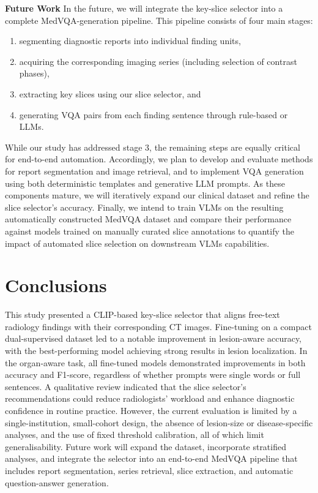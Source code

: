 \documentclass[bioengineering,article,submit,pdftex,moreauthors]{Definitions/mdpi}
\begin{document}
\textbf{Future Work}
In the future, we will integrate the key-slice selector into a complete MedVQA-generation pipeline. 
This pipeline consists of four main stages: 
\begin{enumerate}
  \item segmenting diagnostic reports into individual finding units, 
  \item acquiring the corresponding imaging series (including selection of contrast phases),
  \item extracting key slices using our slice selector, and 
  \item generating VQA pairs from each finding sentence through rule-based or LLMs.
\end{enumerate}
While our study has addressed stage 3, 
the remaining steps are equally critical for end-to-end automation.
Accordingly, we plan to develop and evaluate methods for report segmentation and image retrieval, 
and to implement VQA generation using both deterministic templates and generative LLM prompts. 
As these components mature, we will iteratively expand our clinical dataset and refine the slice selector’s accuracy. 
Finally, we intend to train VLMs on the resulting automatically constructed MedVQA dataset and compare their performance against 
models trained on manually curated slice annotations to quantify the impact of automated slice selection on downstream VLMs capabilities.


\section{Conclusions}

This study presented a CLIP-based key-slice selector that aligns free-text radiology findings with their corresponding CT images. Fine-tuning on a compact dual-supervised dataset led to a notable improvement in lesion-aware accuracy, with the best-performing model achieving strong results in lesion localization. In the organ-aware task, all fine-tuned models demonstrated improvements in both accuracy and F1-score, regardless of whether prompts were single words or full sentences. A qualitative review indicated that the slice selector’s recommendations could reduce radiologists’ workload and enhance diagnostic confidence in routine practice. However, the current evaluation is limited by a single-institution, small-cohort design, the absence of lesion-size or disease-specific analyses, and the use of fixed threshold calibration, all of which limit generalisability. Future work will expand the dataset, incorporate stratified analyses, and integrate the selector into an end-to-end MedVQA pipeline that includes report segmentation, series retrieval, slice extraction, and automatic question-answer generation.
\end{document}
